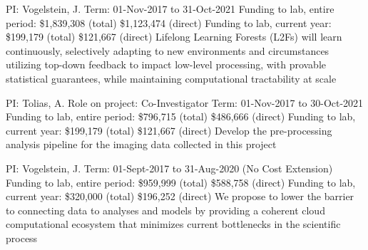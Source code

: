 \documentclass[10pt,colorlinks=true,urlcolor=blue]{moderncv}
\begin{document}
{\newline PI: Vogelstein, J.
\newline Term: 01-Nov-2017 to 31-Oct-2021
\newline Funding to lab, entire period: \$1,839,308 (total) \$1,123,474 (direct)
\newline Funding to lab, current year: \$199,179 (total) \$121,667 (direct)
\newline Lifelong Learning Forests (L2Fs) will learn continuously, selectively adapting to new
environments and circumstances utilizing top-down feedback to impact low-level
processing, with provable statistical guarantees, while maintaining computational tractability
at scale}{}{}{}{}

{\newline PI: Tolias, A.
\newline Role on project: Co-Investigator
\newline Term: 01-Nov-2017 to 30-Oct-2021
\newline Funding to lab, entire period: \$796,715 (total) \$486,666 (direct)
\newline Funding to lab, current year: \$199,179 (total) \$121,667 (direct)
\newline Develop the pre-processing analysis pipeline for the imaging data collected in this project}{}{}{}

{\newline PI: Vogelstein, J.
\newline Term: 01-Sept-2017 to 31-Aug-2020 (No Cost Extension)
\newline Funding to lab, entire period: \$959,999 (total) \$588,758 (direct)
\newline Funding to lab, current year: \$320,000 (total) \$196,252 (direct)
\newline We propose to lower the barrier to connecting data to analyses and models by providing a
coherent cloud computational ecosystem that minimizes current bottlenecks in the scientific
process}{}{}{}
\end{document}
